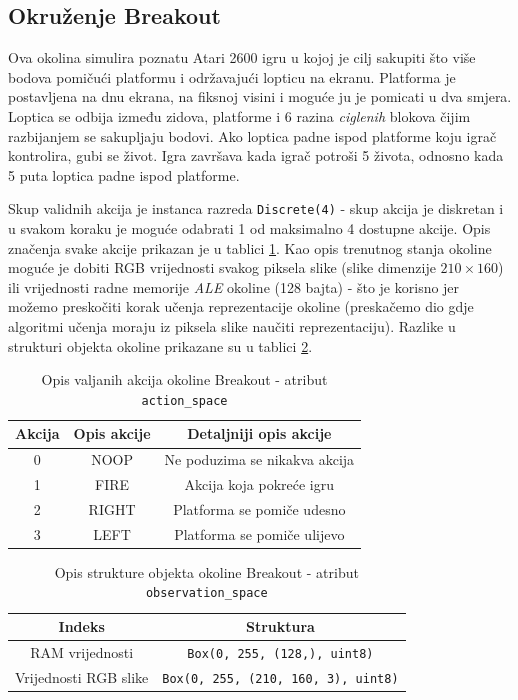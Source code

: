 \subsection{Okruženje Breakout}

Ova okolina simulira poznatu Atari 2600 igru u kojoj je cilj sakupiti što više bodova pomičući platformu i održavajući lopticu na ekranu. Platforma je postavljena na dnu ekrana, na fiksnoj visini i moguće ju je pomicati u dva smjera. Loptica se odbija između zidova, platforme i 6 razina \textit{ciglenih} blokova čijim razbijanjem se sakupljaju bodovi. Ako loptica padne ispod platforme koju igrač kontrolira, gubi se život. Igra završava kada igrač potroši 5 života, odnosno kada 5 puta loptica padne ispod platforme. 

Skup validnih akcija je instanca razreda \texttt{Discrete(4)} - skup akcija je diskretan i u svakom koraku je moguće odabrati 1 od maksimalno 4 dostupne akcije. Opis značenja svake akcije prikazan je u tablici \ref{table:breakout-action}. Kao opis trenutnog stanja okoline moguće je dobiti RGB vrijednosti svakog piksela slike (slike dimenzije $210 \times 160$) ili vrijednosti radne memorije \textit{ALE} okoline (128 bajta) - što je korisno jer možemo preskočiti korak učenja reprezentacije okoline (preskačemo dio gdje algoritmi učenja moraju iz piksela slike naučiti reprezentaciju). Razlike u strukturi objekta okoline prikazane su u tablici \ref{table:breakout-observation}. 

\begin{table}[ht]
    \centering
    \caption{Opis valjanih akcija okoline Breakout - atribut \texttt{action_space}}
    \begin{tabular}{c c c}
        \toprule
        Akcija & Opis akcije & Detaljniji opis akcije  \\
        \midrule
        0 & NOOP & Ne poduzima se nikakva akcija \\
        1 & FIRE & Akcija koja pokreće igru \\ 
        2 & RIGHT & Platforma se pomiče udesno \\ 
        3 & LEFT & Platforma se pomiče ulijevo  \\
        \bottomrule
    \end{tabular}
    \label{table:breakout-action}
\end{table}

\begin{table}[H]
    \centering
    \caption{Opis strukture objekta okoline Breakout - atribut \texttt{observation_space}}
    \begin{tabular}{c c}
        \toprule
        Indeks & Struktura  \\
        \midrule
        RAM vrijednosti & \texttt{Box(0, 255, (128,), uint8)}  \\ 
        Vrijednosti RGB slike & \texttt{Box(0, 255, (210, 160, 3), uint8)}  \\
        \bottomrule
    \end{tabular}
    \label{table:breakout-observation}
\end{table}

